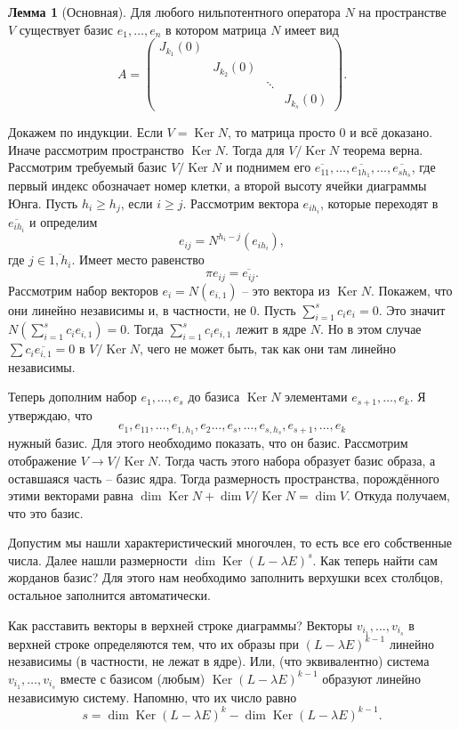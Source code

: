 \documentclass[10pt,a4paper,oneside]{book}
\theoremstyle{definition}
\newtheorem{lem}{\color{green!50!black}Лемма}
\renewcommand{\geq}{\geqslant}
\newcommand{\ovl}{\overline}
\DeclareMathOperator{\Ker}{Ker}
\def\lm{\begin{lem}}
\def\elm{\end{lem}}
\begin{document}
\lm[Основная] Для любого нильпотентного оператора $N$ на пространстве $V$ существует базис $e_1,\dots,e_n$ в котором матрица $N$ имеет вид
$$A=\begin{pmatrix}
J_{k_1}(0) &&&\\
& J_{k_2}(0) &&\\
&& \ddots& \\
&&& J_{k_s}(0)
\end{pmatrix}.
$$
\elm
\proof
Докажем по индукции. Если $V=\Ker N$, то матрица просто 0 и всё доказано. Иначе рассмотрим пространство $\Ker N$. Тогда для $V/\Ker N$ теорема верна. Рассмотрим требуемый базис $V/\Ker N$ и поднимем его $\ovl{e_{11}},\dots,\ovl{e_{1h_1}},\dots, \ovl{e_{sh_s}}$, где первый индекс обозначает номер клетки, а второй высоту ячейки диаграммы Юнга. Пусть $h_i\geq h_j$, если $i\geq j$.
Рассмотрим вектора $e_{ih_i}$, которые переходят в $\ovl{e_{ih_i}}$ и определим $$e_{ij}=N^{h_i-j}(e_{ih_i}),$$ где  $j\in \ovl{1,h_i}$. Имеет место равенство $$\pi{e_{ij}}=\ovl{e_{ij}}.$$
Рассмотрим набор векторов $e_i=N(e_{i,1})$ -- это вектора из $\Ker N$.
Покажем, что они линейно независимы и, в частности, не 0. Пусть $\sum_{i=1}^s c_ie_i=0$. Это значит $N(\sum_{i=1}^s c_i e_{i,1} )=0$. Тогда $\sum_{i=1}^s c_i e_{i,1} $ лежит в ядре $N$. Но в этом случае $\sum c_i \ovl{e_{i,1}}=0$ в $V/\Ker N$, чего не может быть, так как они там линейно независимы.

Теперь дополним набор $e_1,\dots,e_s$ до базиса $\Ker N$  элементами $e_{s+1},\dots,e_k$. Я утверждаю, что $$e_1, e_{11},\dots, e_{1,h_1},e_2\dots, e_s, \dots, e_{s,h_s}, e_{s+1},\dots, e_k$$
нужный базис. Для этого необходимо показать, что он базис. Рассмотрим отображение $V \to V/\Ker N$. Тогда часть этого набора образует базис образа, а оставшаяся часть -- базис ядра. Тогда размерность пространства, порождённого этими векторами равна $\dim \Ker N + \dim V/\Ker N = \dim V$. Откуда получаем, что это базис.

\endproof

\endproof








Допустим мы нашли характеристический многочлен, то есть все его собственные числа. Далее нашли размерности $\dim \Ker(L-\lambda E)^s$. Как теперь найти сам жорданов базис? Для этого нам необходимо заполнить верхушки всех столбцов, остальное заполнится автоматически.



Как расставить векторы в верхней строке диаграммы? Векторы $v_{i_1}, \dots, v_{i_s}$  в верхней строке определяются тем, что их образы при $(L-\lambda E)^{k-1}$ линейно независимы (в частности, не лежат в ядре). Или, (что эквивалентно) система $v_{i_1}, \dots, v_{i_s}$ вместе с базисом (любым) $\Ker (L-\lambda E)^{k-1}$ образуют линейно независимую систему. Напомню, что их число равно
$$s=\dim \Ker (L-\lambda E)^k - \dim \Ker (L-\lambda E)^{k-1}.$$
\end{document}

